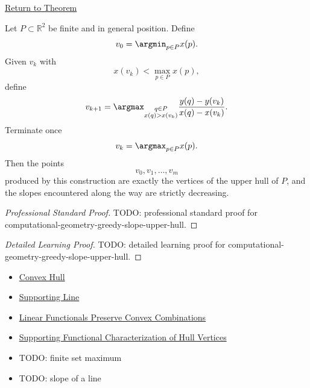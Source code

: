\newpage
{}
\label{prf:computational-geometry-greedy-slope-upper-hull}

\begin{remark*}[Return]
\hyperref[thm:computational-geometry-greedy-slope-upper-hull]{Return to Theorem}
\end{remark*}

\begin{theorem*}
Let \(P\subset\mathbb{R}^2\) be finite and in general position. Define
\[
  v_0=\argmin_{p\in P}x(p).
\]
Given \(v_k\) with
\[
  x(v_k)<\max_{p\in P}x(p),
\]
define
\[
  v_{k+1}
  =
  \argmax_{\substack{q\in P\\x(q)>x(v_k)}}
  \frac{y(q)-y(v_k)}{x(q)-x(v_k)}.
\]
Terminate once
\[
  v_k=\argmax_{p\in P}x(p).
\]
Then the points
\[
  v_0,v_1,\dots,v_m
\]
produced by this construction are exactly the vertices of the upper hull of
\(P\), and the slopes encountered along the way are strictly decreasing.
\end{theorem*}

\begin{proof}[Professional Standard Proof]
\LRAProofBodyStart
TODO: professional standard proof for computational-geometry-greedy-slope-upper-hull.
\end{proof}

\begin{proof}[Detailed Learning Proof]
\LRAProofBodyStart
TODO: detailed learning proof for computational-geometry-greedy-slope-upper-hull.
\end{proof}

\begin{remark*}
\end{remark*}

\begin{dependencies}
\begin{itemize}
  \item \hyperref[def:computational-geometry-convex-hull]{Convex Hull}
  \item \hyperref[def:computational-geometry-supporting-line]{Supporting Line}
  \item \hyperref[lem:computational-geometry-linear-functionals-convex-combinations]{Linear Functionals Preserve Convex Combinations}
  \item \hyperref[thm:computational-geometry-supporting-functional-hull-vertices]{Supporting Functional Characterization of Hull Vertices}
  \item TODO: finite set maximum
  \item TODO: slope of a line
\end{itemize}
\end{dependencies}

\clearpage
